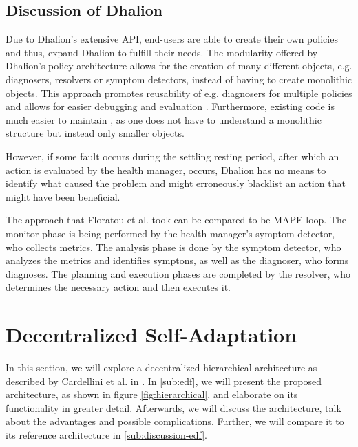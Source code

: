         \subsection{Discussion of Dhalion}
        \label{sub:dhalion-discussion}
        Due to Dhalion's extensive API, end-users are able to create their own policies and thus, expand Dhalion to fulfill their needs. 
        The modularity offered by Dhalion's policy architecture allows for the creation of many different objects, e.g. diagnosers, resolvers or symptom detectors, 
        instead of having to create monolithic objects.
        This approach promotes reusability of e.g. diagnosers for multiple policies and allows for easier debugging and evaluation  \cite[p. 5]{dhalion}.
        Furthermore, existing code is much easier to maintain \cite[p. 5]{dhalion}, as one does not have to understand a monolithic structure but instead only smaller objects.
        
        \quad However, if some fault occurs during the settling resting period, after which an action is evaluated by the health manager, occurs, Dhalion has no means to 
        identify what caused the problem and might erroneously blacklist an action that might have been beneficial.

        \quad The approach that Floratou et al. took can be compared to be MAPE loop. The monitor phase is being performed by the health manager's symptom detector, who collects metrics.
        The analysis phase is done by the symptom detector, who analyzes the metrics and identifies symptons, as well as the diagnoser, who forms diagnoses.
        The planning and execution phases are completed by the resolver, who determines the necessary action and then executes it.

    \section{Decentralized Self-Adaptation}
    \label{sec:hierarchical}
    In this section, we will explore a decentralized hierarchical architecture as described by Cardellini et al. in \cite{cardellini}.
    In \ref{sub:edf}, we will present the proposed architecture, as shown in figure \ref{fig:hierarchical}, and elaborate on its functionality in greater detail.
    Afterwards, we will discuss the architecture, talk about the advantages and possible complications. Further, we will compare it to its reference architecture in \ref{sub:discussion-edf}.


